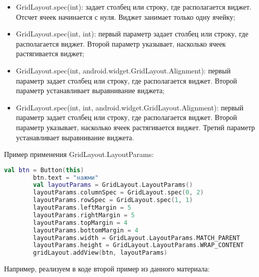 \begin{itemize}
    \item GridLayout.spec(int): задает столбец или строку, где располагается
    виджет. Отсчет ячеек начинается с нуля. Виджет занимает только
    одну ячейку;
    \item GridLayout.spec(int, int): первый параметр задает столбец или
    строку, где располагается виджет. Второй параметр указывает,
    насколько ячеек растягивается виджет;
    \item GridLayout.spec(int, android.widget.GridLayout.Alignment): первый
    параметр задает столбец или строку, где располагается виджет.
    Второй параметр устанавливает выравнивание виджета;
    \item GridLayout.spec(int, int, android.widget.GridLayout.Alignment):
    первый параметр задает столбец или строку, где располагается
    виджет. Второй параметр указывает, насколько ячеек растягивается
    виджет. Третий параметр устанавливает выравнивание виджета.
\end{itemize}
Пример применения GridLayout.LayoutParams:
\begin{lstlisting}[language=Kotlin, caption=\leftline{Kotlin}, label=lst:GridLayout.LayoutParams]
val btn = Button(this)
        btn.text = "нажми"
        val layoutParams = GridLayout.LayoutParams()
        layoutParams.columnSpec = GridLayout.spec(0, 2)
        layoutParams.rowSpec = GridLayout.spec(1, 1)
        layoutParams.leftMargin = 5
        layoutParams.rightMargin = 5
        layoutParams.topMargin = 4
        layoutParams.bottomMargin = 4
        layoutParams.width = GridLayout.LayoutParams.MATCH_PARENT
        layoutParams.height = GridLayout.LayoutParams.WRAP_CONTENT
        gridLayout.addView(btn, layoutParams)
\end{lstlisting}
Например, реализуем в коде второй пример из данного материала:
